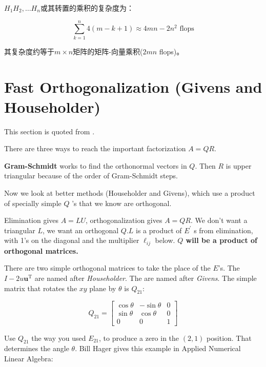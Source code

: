 $H_{1} H_{2}, \ldots H_{n} $或其转置的乘积的复杂度为： 

$$ \sum_{k=1}^{n} 4(m-k+1) \approx 4 m n-2 n^{2}  \text{ flops}$$

其复杂度约等于$m \times n$矩阵的矩阵-向量乘积($2mn$ flops)。 


\section{Fast Orthogonalization (Givens and Householder)}

\begin{remark}
    This section is quoted from \cite{Strang1993IntroductionTL}.
\end{remark}

There are three ways to reach the important factorization $A=Q R$. 

\textbf{Gram-Schmidt} works to find the orthonormal vectors in $Q .$ Then $R$ is upper triangular because of the order of Gram-Schmidt steps. 

Now we look at better methods (Householder and Givens), which use a product of specially simple $Q$ 's that we know are orthogonal.

Elimination gives $A=L U$, orthogonalization gives $A=Q R$. We don't want a triangular $L$, we want an orthogonal $Q . L$ is a product of $E^{\prime}$ s from elimination, with 1's on the diagonal and the multiplier $\ell_{i j}$ below. \textbf{$Q$ will be a product of orthogonal matrices.}

There are two simple orthogonal matrices to take the place of the $E$'s. The  $I-2 u \boldsymbol{u}^{\mathrm{T}}$ are named after \textit{Householder}. The  are named after \textit{Givens}. The simple matrix that rotates the $x y$ plane by $\theta$ is $Q_{21}$:  

\begin{definition}
    $$Q_{21}=\left[\begin{array}{crc}
        \cos \theta & -\sin \theta & 0 \\
        \sin \theta & \cos \theta & 0 \\
        0 & 0 & 1
        \end{array}\right]$$
\end{definition}

Use $Q_{21}$ the way you used $E_{21}$, to produce a zero in the $(2,1)$ position. That determines the angle $\theta$. Bill Hager gives this example in Applied Numerical Linear Algebra:

